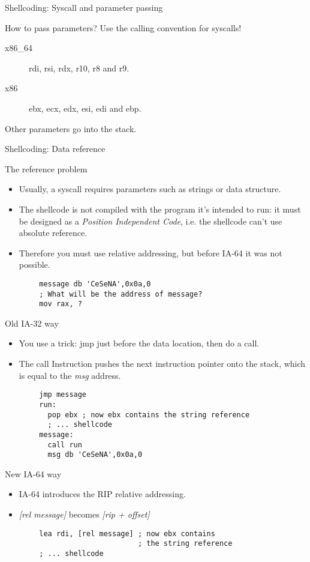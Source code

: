 \begin{frame}{Shellcoding: Syscall and parameter passing}
	\begin{block}{How to pass parameters?}
		Use the calling convention for syscalls!
		\begin{description}
			\item[x86\_64]rdi, rsi, rdx, r10, r8 and r9.
			\item[x86]ebx, ecx, edx, esi, edi and ebp.
		\end{description}
		Other parameters go into the stack.
	\end{block}
\end{frame}

\begin{frame}{Shellcoding: Data reference}
	\begin{block}{The reference problem}
		\begin{itemize}
			\item Usually, a syscall requires parameters such as strings or data structure.
			\item The shellcode is not compiled with the program it's intended to run: it must be designed as a \emph{Position Independent Code}, i.e. the shellcode can't use absolute reference.
			\item Therefore you must use relative addressing, but before IA-64 it was not possible.
		\end{itemize}
	\end{block}
	\acode
	\begin{lstlisting}
		message db 'CeSeNA',0x0a,0
		; What will be the address of message?
		mov rax, ?
	\end{lstlisting}

	\framebreak

	\begin{block}{Old IA-32 way}
		\begin{itemize}
			\item You use a trick: jmp just before the data location, then do a
				call.
			\item The call Instruction pushes the next instruction pointer onto the stack, which is equal to the \emph{msg} address.
		\end{itemize}
	\end{block}
	\acode
	\begin{lstlisting}
		jmp message
		run:
		  pop ebx ; now ebx contains the string reference
		  ; ... shellcode
		message:
		  call run
		  msg db 'CeSeNA',0x0a,0
	\end{lstlisting}
	\begin{block}{New IA-64 way}
		\begin{itemize}
			\item IA-64 introduces the RIP relative addressing.
			\item \emph{[rel message]} becomes \emph{[rip + offset]}
		\end{itemize}
	\end{block}
	\acode
	\begin{lstlisting}
		lea rdi, [rel message] ; now ebx contains
		                       ; the string reference
		; ... shellcode


\end{lstlisting}
\end{frame}
